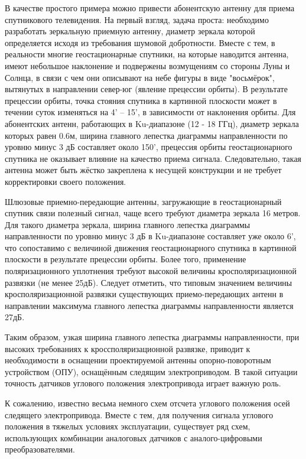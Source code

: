 В качестве простого примера можно привести абонентскую антенну для приема спутникового телевидения. 
На первый взгляд, задача проста: необходимо разработать зеркальную приемную антенну, диаметр зеркала которой определяется исходя из требования шумовой добротности. 
Вместе с тем, в реальности многие геостационарные спутники, на которые наводится антенна, имеют небольшое наклонение и подвержены возмущениям со 
стороны Луны и Солнца, 
в связи с чем они описывают на небе фигуры в виде "восьмёрок", вытянутых в направлении север-юг (явление прецессии орбиты). 
В результате прецессии орбиты, точка стояния спутника в картинной плоскости может в течении суток изменяться на 4' – 15', в зависимости от наклонения орбиты. 
Для абонентских антенн, работающих в Ku-диапазоне (12 - 18 ГГц), диаметр зеркала которых равен 0.6м, ширина главного лепестка диаграммы направленности 
по уровню минус 3 дБ составляет около 150', 
прецессия орбиты геостационарного спутника не оказывает влияние на качество приема сигнала. Следовательно, такая антенна может быть жёстко закреплена к несущей конструкции 
и не требует корректировки своего положения. 

Шлюзовые приемно-передающие антенны, загружающие в геостационарный спутник связи полезный сигнал, чаще всего требуют диаметра зеркала 16 метров. 
Для такого диаметра зеркала, ширина главного лепестка диаграммы направленности по уровню минус 3 дБ в Ku-диапазоне составляет уже около 6', 
что сопоставимо с величиной движения геостационарного спутника в картинной плоскости в результате прецессии орбиты. 
Более того, применение поляризационного уплотнения требуют высокой величины кросполяризационной развязки (не менее 25дБ). 
Следует отметить, что типовым значением величины кросполяризационной развязки существующих приемо-передающих антенн 
в направлении максимума главного лепестка диаграммы направленности является 27дБ. 

Таким образом, узкая ширина главного лепестка диаграммы направленности, при высоких требованиях к кроссполяризационной развязке, 
приводит к необходимости в оснащении проектируемой антенны опорно-поворотным устройством (ОПУ), оснащённым следящим электроприводом.  
В такой ситуации точность датчиков углового положения электропривода играет важную роль.  

К сожалению, известно весьма немного схем отсчета углового положения осей следящего электропривода. Вместе с тем, для получения сигнала углового положения в 
тяжелых условиях эксплуатации, существует ряд схем, использующих комбинации аналоговых датчиков с аналого-цифровыми преобразователями.

